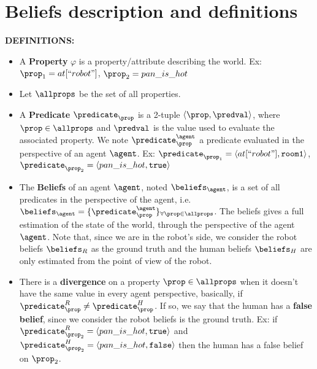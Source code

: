 \section{Beliefs description and definitions}
\textbf{DEFINITIONS:}
\begin{itemize}

    \item A \textbf{Property} $\varphi$ is a property/attribute describing the world.
    \subitem Ex: $\prop_1=at[``robot"]$, $\prop_2=pan\_is\_hot$
    
    \item Let $\allprops$ be the set of all properties.
    
    \item A \textbf{Predicate} $\predicate_{\prop}$ is a 2-tuple $\langle \prop, \predval \rangle$, where $\prop\in\allprops$ and $\predval$ is the value used to evaluate the associated property. We note $\predicate_\prop^\agent$ a predicate evaluated in the perspective of an agent $\agent$.
    \subitem Ex: $\predicate_{\prop_1}=\langle at[``robot"], \texttt{room1} \rangle$, $\predicate_{\prop_2}=\langle pan\_is\_hot, \texttt{true} \rangle$
    
    \item The \textbf{Beliefs} of an agent $\agent$, noted $\beliefs_\agent$, is a set of all predicates in the perspective of the agent, i.e. $\beliefs_\agent = \{ \predicate_\prop^\agent \}_{\forall \prop\in\allprops}$. The beliefs gives a full estimation of the state of the world, through the perspective of the agent $\agent$. Note that, since we are in the robot's side, we consider the robot beliefs $\beliefs_R$ as the ground truth and the human beliefs $\beliefs_H$ are only estimated from the point of view of the robot.
    
    \item There is a \textbf{divergence} on a property $\prop\in\allprops$ when it doesn't have the same value in every agent perspective, basically, if $\predicate_{\prop}^R \ne \predicate_{\prop}^H$. If so, we say that the human has a \textbf{false belief}, since we consider the robot beliefs is the ground truth.
    \subitem Ex: if $\predicate_{\prop_2}^R=\langle pan\_is\_hot, \texttt{true} \rangle$ and $\predicate_{\prop_2}^H=\langle pan\_is\_hot, \texttt{false} \rangle$ then the human has a false belief on $\prop_2$.
    
\end{itemize}